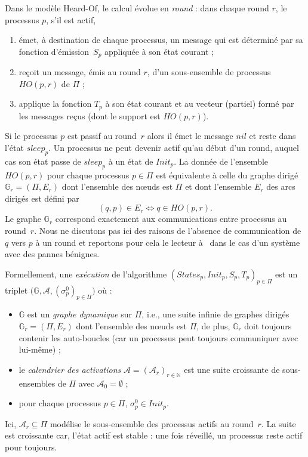 \documentclass{article}
\begin{document}
Dans le mod\`ele Heard-Of, le calcul \'evolue en \emph{round} : dans chaque round $r$, 
	le processus $p$, s'il est actif,  
	\begin{enumerate}
	\item \'emet, \`a destination de chaque processus, un message qui est d\'etermin\'e par sa fonction d'\'emission~$S_p$  
		appliqu\'ee \`a son \'etat courant ;
	\item re\c{c}oit un message, \'emis au round $r$, d'un sous-ensemble de processus $HO(p,r)$ de $\Pi$ ;
        \item  applique la fonction  $T_p$ \`a son \'etat courant  et au vecteur (partiel) form\'e par les messages re\c{c}us (dont le support est 
         $HO(p,r)$).
	\end{enumerate}
Si le processus $p$ est passif au round~$r$ alors il \'emet le message $nil$ et reste dans l'\'etat $sleep_p$.
Un processus ne peut devenir actif qu'au d\'ebut d'un round, auquel cas son \'etat passe de $sleep_p$ \`a 
	un \'etat de $Init_p$.
La donn\'ee de l'ensemble $HO(p,r)$ pour chaque processus $p \in \Pi$ est \'equivalente \`a celle du graphe dirig\'e
	$\mathds{G}_r = (\Pi, E_r)$ dont l'ensemble des n\oe uds est $\Pi$ et dont l'ensemble $E_r$ des arcs dirig\'es 
	est d\'efini par
	$$ (q,p) \in E_r \Leftrightarrow q \in HO(p,r) .$$	
Le graphe $\mathds{G}_r $ correspond exactement aux communications entre processus au round~$r$.
Nous ne discutons pas ici des raisons de l'absence de communication de $q$ vers $p$ \`a un round et reportons pour cela  le lecteur 
	\`a~\cite{CB09} dans le cas d'un syst\`eme avec des pannes b\'enignes.

Formellement, une \emph{ex\'ecution} de l'algorithme  $(States_p, Init_p, S_p,T_p)_{p\in \Pi}$ est 
	un triplet $\big( \mathds{G} ,  \mathcal{A} , (\sigma^0_p)_{p \in \Pi} \big)$ où :
	\begin{itemize}
		\item $\mathds{G}$ est un \emph{graphe dynamique} sur $\Pi$, i.e., une suite infinie de graphes dirig\'es 
			$\mathds{G}_r = (\Pi, E_r)$ dont l'ensemble des n\oe uds est $\Pi$, 
			de plus, $\mathds{G}_r$ doit toujours contenir les auto-boucles (car un processus peut toujours communiquer avec lui-même) ; 
		\item le \emph{calendrier des activations} $\mathcal{A} = (\mathcal{A}_r)_{r \in \mathds{N}}$ est une suite 
			croissante de sous-ensembles de $\Pi$ 
			avec $\mathcal{A}_0 = \emptyset$ ;
		\item pour chaque processus $p\in \Pi$, $\sigma^0_p \in Init_p$.
	\end{itemize}
Ici,  $\mathcal{A}_r \subseteq \Pi$ modélise le sous-ensemble des processus actifs au round~$r$.
La suite est croissante car, l'état actif est stable : une fois r\'eveill\'e, un processus reste actif pour toujours.
\end{document}
